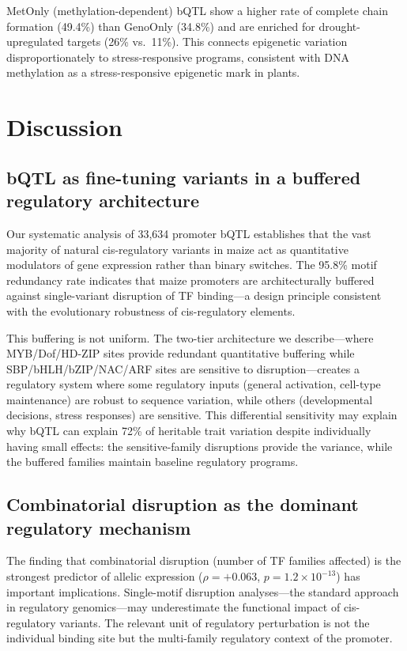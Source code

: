 \documentclass[11pt,a4paper]{article}
\begin{document}
MetOnly (methylation-dependent) bQTL show a higher rate of complete chain formation (49.4\%) than GenoOnly (34.8\%) and are enriched for drought-upregulated targets (26\% vs.\ 11\%). This connects epigenetic variation disproportionately to stress-responsive programs, consistent with DNA methylation as a stress-responsive epigenetic mark in plants.

\section{Discussion}

\subsection{bQTL as fine-tuning variants in a buffered regulatory architecture}

Our systematic analysis of 33,634 promoter bQTL establishes that the vast majority of natural cis-regulatory variants in maize act as quantitative modulators of gene expression rather than binary switches. The 95.8\% motif redundancy rate indicates that maize promoters are architecturally buffered against single-variant disruption of TF binding---a design principle consistent with the evolutionary robustness of cis-regulatory elements.

This buffering is not uniform. The two-tier architecture we describe---where MYB/Dof/HD-ZIP sites provide redundant quantitative buffering while SBP/bHLH/bZIP/NAC/ARF sites are sensitive to disruption---creates a regulatory system where some regulatory inputs (general activation, cell-type maintenance) are robust to sequence variation, while others (developmental decisions, stress responses) are sensitive. This differential sensitivity may explain why bQTL can explain 72\% of heritable trait variation despite individually having small effects: the sensitive-family disruptions provide the variance, while the buffered families maintain baseline regulatory programs.

\subsection{Combinatorial disruption as the dominant regulatory mechanism}

The finding that combinatorial disruption (number of TF families affected) is the strongest predictor of allelic expression ($\rho = +0.063$, $p = 1.2 \times 10^{-13}$) has important implications. Single-motif disruption analyses---the standard approach in regulatory genomics---may underestimate the functional impact of cis-regulatory variants. The relevant unit of regulatory perturbation is not the individual binding site but the multi-family regulatory context of the promoter.
\end{document}
